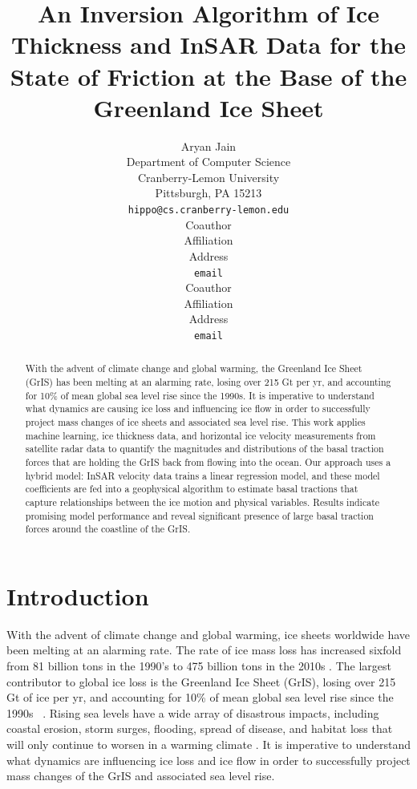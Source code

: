 \documentclass{article}
\title{An Inversion Algorithm of Ice Thickness and InSAR Data for
the State of Friction at the Base of the Greenland Ice Sheet}
\author{%
  Aryan Jain\\
  Department of Computer Science\\
  Cranberry-Lemon University\\
  Pittsburgh, PA 15213 \\
  \texttt{hippo@cs.cranberry-lemon.edu} \\
   \And
   Coauthor \\
   Affiliation \\
   Address \\
   \texttt{email} \\
   \AND
   Coauthor \\
   Affiliation \\
   Address \\
   \texttt{email} \\
}
\begin{document}
\maketitle

\begin{abstract}
With the advent of climate change and global warming, the Greenland Ice Sheet (GrIS) has been melting at an alarming rate, losing over 215 Gt per yr, and accounting for 10\% of mean global sea level rise since the 1990s. It is imperative to understand what dynamics are causing ice loss and influencing ice flow in order to successfully project mass changes of ice sheets and associated sea level rise. This work applies machine learning, ice thickness data, and horizontal ice velocity measurements from satellite radar data to quantify the magnitudes and distributions of the basal traction forces that are holding the GrIS back from flowing into the ocean. Our approach uses a hybrid model: InSAR velocity data trains a linear regression model, and these model coefficients are fed into a geophysical algorithm to estimate basal tractions that capture relationships between the ice motion and physical variables. Results indicate promising model performance and reveal significant presence of large basal traction forces around the coastline of the GrIS.


\end{abstract}

\section{Introduction}

With the advent of climate change and global warming, ice sheets worldwide have been melting at an alarming rate. The rate of ice mass loss has increased sixfold from 81 billion tons in the 1990’s to 475 billion tons in the 2010s \cite{the_imbie_team_mass_2020}. The largest contributor to global ice loss is the Greenland Ice Sheet (GrIS), losing over 215 Gt of ice per yr, and accounting for 10\% of mean global sea level rise since the 1990s ~\cite{stocker_climate_2013}. Rising sea levels have a wide array of disastrous impacts, including coastal erosion, storm surges, flooding, spread of disease, and habitat loss that will only continue to worsen in a warming climate \cite{pattyn_greenland_2018}. It is imperative to understand what dynamics are influencing ice loss and ice flow in order to successfully project mass changes of the GrIS and associated sea level rise.
\end{document}
